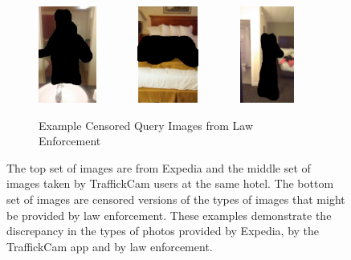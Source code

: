 \begin{figure}[ht!]
\begin{center}
  \begin{subfigure}[b]{\textwidth}
  \centering
    \includegraphics[height=120px]{figures/chapter2/backpage/3.jpg}
    ~~~~~~
    \includegraphics[height=120px]{figures/chapter2/backpage/1.jpg}
    ~~~~~~
    \includegraphics[height=120px]{figures/chapter2/backpage/2.jpg}
    \caption{Example Censored Query Images from Law Enforcement}
  \end{subfigure}
  
  \caption[Example images from TraffickCam and Expedia.]{The top set of images are from Expedia and the middle set of images taken by TraffickCam users at the same hotel. The bottom set of images are censored versions of the types of images that might be provided by law enforcement. These examples demonstrate the discrepancy in the types of photos provided by Expedia, by the TraffickCam app and by law enforcement.}
  \label{fig:example_ims}
  \end{center}
\end{figure}

